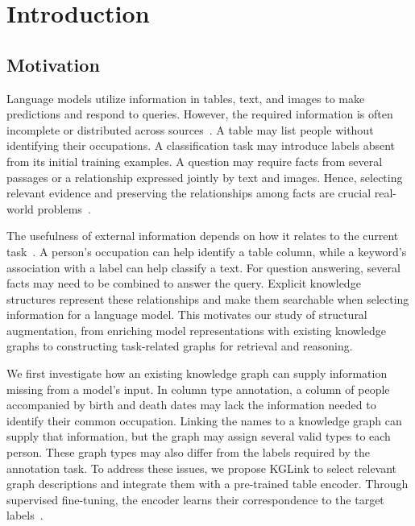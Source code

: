\chapter{Introduction}
\label{ch:introduction}

\section{Motivation}
\label{sec:introduction:motivation}
Language models utilize information in tables, text, and images to make predictions and respond to queries. 
However, the required information is often incomplete or distributed across sources~\cite{bg-reca,bg-mmqa}. A table may list people without identifying their occupations. A classification task may introduce labels absent from its initial training examples. A question may require facts from several passages or a relationship expressed jointly by text and images. 
Hence, selecting relevant evidence and preserving the relationships among facts are crucial real-world problems~\cite{bg-hipporag}.

The usefulness of external information depends on how it relates to the current task~\cite{bg-reca,bg-dpr}. A person's occupation can help identify a table column, while a keyword's association with a label can help classify a text. For question answering, several facts may need to be combined to answer the query. Explicit knowledge structures represent these relationships and make them searchable when selecting information for a language model. This motivates our study of structural augmentation, from enriching model representations with existing knowledge graphs to constructing task-related graphs for retrieval and reasoning.

We first investigate how an existing knowledge graph can supply information missing from a model's input. In column type annotation, a column of people accompanied by birth and death dates may lack the information needed to identify their common occupation. Linking the names to a knowledge graph can supply that information, but the graph may assign several valid types to each person. These graph types may also differ from the labels required by the annotation task. To address these issues, we propose KGLink to select relevant graph descriptions and integrate them with a pre-trained table encoder. Through supervised fine-tuning, the encoder learns their correspondence to the target labels~\cite{kglink-publication}.

